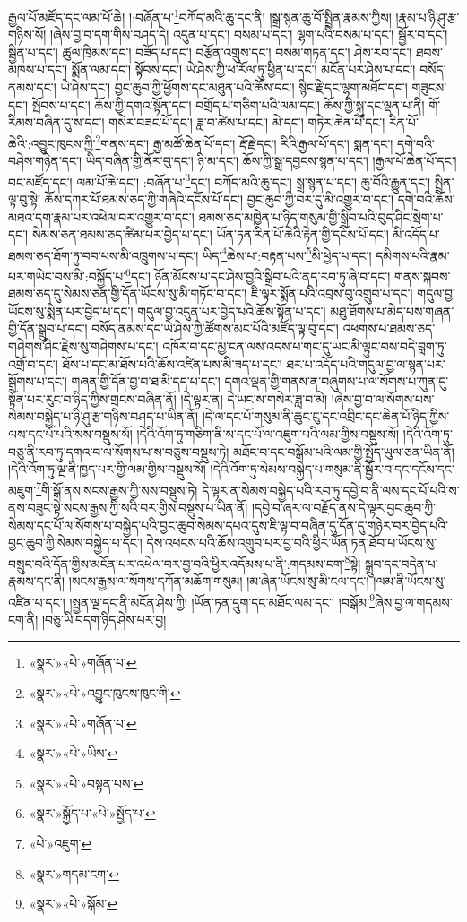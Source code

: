 རྒྱལ་པོ་མཛོད་དང་ལམ་པོ་ཆེ། །:བཞོན་པ་\footnote{«སྣར་»«པེ་»གཞོན་པ་}བཀོད་མའི་ཆུ་དང་ནི། །སྒྲ་སྙན་ཆུ་བོ་སྤྲིན་རྣམས་ཀྱིས། །རྣམ་པ་ཉི་ཤུ་རྩ་གཉིས་སོ། །ཞེས་བྱ་བ་དག་གིས་བཤད་དེ། འདུན་པ་དང་། བསམ་པ་དང་། ལྷག་པའི་བསམ་པ་དང་། སྦྱོར་བ་དང་། སྦྱིན་པ་དང་། ཚུལ་ཁྲིམས་དང་། བཟོད་པ་དང་། བརྩོན་འགྲུས་དང་། བསམ་གཏན་དང་། ཤེས་རབ་དང་། ཐབས་མཁས་པ་དང་། སྨོན་ལམ་དང་། སྟོབས་དང་། ཡེ་ཤེས་ཀྱི་ཕ་རོལ་ཏུ་ཕྱིན་པ་དང་། མངོན་པར་ཤེས་པ་དང་། བསོད་ནམས་དང་། ཡེ་ཤེས་དང་། བྱང་ཆུབ་ཀྱི་ཕྱོགས་དང་མཐུན་པའི་ཆོས་དང་། སྙིང་རྗེ་དང་ལྷག་མཐོང་དང་། གཟུངས་དང་། སྤོབས་པ་དང་། ཆོས་ཀྱི་དགའ་སྟོན་དང་། བགྲོད་པ་གཅིག་པའི་ལམ་དང་། ཆོས་ཀྱི་སྐུ་དང་ལྡན་པ་ནི། གོ་རིམས་བཞིན་དུ་ས་དང་། གསེར་བཟང་པོ་དང་། ཟླ་བ་ཚེས་པ་དང་། མེ་དང་། གཏེར་ཆེན་པོ་དང་། རིན་པོ་ཆེའི་:འབྱུང་ཁུངས་ཀྱི་\footnote{«སྣར་»«པེ་»འབྱུང་ཁུངས་ཁུང་གི་}གནས་དང་། རྒྱ་མཚོ་ཆེན་པོ་དང་། རྡོ་རྗེ་དང་། རིའི་རྒྱལ་པོ་དང་། སྨན་དང་། དགེ་བའི་བཤེས་གཉེན་དང་། ཡིད་བཞིན་གྱི་ནོར་བུ་དང་། ཉི་མ་དང་། ཆོས་ཀྱི་སྒྲ་དབྱངས་སྙན་པ་དང་། །རྒྱལ་པོ་ཆེན་པོ་དང་། བང་མཛོད་དང་། ལམ་པོ་ཆེ་དང་། :བཞོན་པ་\footnote{«སྣར་»«པེ་»གཞོན་པ་}དང་། བཀོད་མའི་ཆུ་དང་། སྒྲ་སྙན་པ་དང་། ཆུ་བོའི་རྒྱུན་དང་། སྤྲིན་ལྟ་བུ་སྟེ། ཆོས་དཀར་པོ་ཐམས་ཅད་ཀྱི་གཞིའི་དངོས་པོ་དང་། བྱང་ཆུབ་ཀྱི་བར་དུ་མི་འགྱུར་བ་དང་། དགེ་བའི་ཆོས་མཐའ་དག་རྣམ་པར་འཕེལ་བར་འགྱུར་བ་དང་། ཐམས་ཅད་མཁྱེན་པ་ཉིད་གསུམ་གྱི་སྒྲིབ་པའི་བུད་ཤིང་སྲེག་པ་དང་། སེམས་ཅན་ཐམས་ཅད་ཚིམ་པར་བྱེད་པ་དང་། ཡོན་ཏན་རིན་པོ་ཆེའི་རྟེན་གྱི་དངོས་པོ་དང་། མི་འདོད་པ་ཐམས་ཅད་ཐོག་ཏུ་བབ་པས་མི་འཁྲུགས་པ་དང་། ཡིད་\footnote{«སྣར་»«པེ་»ཡིས་}ཆེས་པ་:བརྟན་པས་\footnote{«སྣར་»«པེ་»བསྟན་པས་}མི་ཕྱེད་པ་དང་། དམིགས་པའི་རྣམ་པར་གཡེང་བས་མི་:བསྐྱོད་པ་\footnote{«སྣར་»སྐྱོད་པ་«པེ་»སྤྱོད་པ་}དང་། ཉོན་མོངས་པ་དང་ཤེས་བྱའི་སྒྲིབ་པའི་ནད་རབ་ཏུ་ཞི་བ་དང་། གནས་སྐབས་ཐམས་ཅད་དུ་སེམས་ཅན་གྱི་དོན་ཡོངས་སུ་མི་གཏོང་བ་དང་། ཇི་ལྟར་སྨོན་པའི་འབྲས་བུ་འགྲུབ་པ་དང་། གདུལ་བྱ་ཡོངས་སུ་སྨིན་པར་བྱེད་པ་དང་། གདུལ་བྱ་འདུན་པར་བྱེད་པའི་ཆོས་སྟོན་པ་དང་། མཐུ་ཐོགས་པ་མེད་པས་གཞན་གྱི་དོན་སྒྲུབ་པ་དང་། བསོད་ནམས་དང་ཡེ་ཤེས་ཀྱི་ཚོགས་མང་པོའི་མཛོད་ལྟ་བུ་དང་། འཕགས་པ་ཐམས་ཅད་གཤེགས་ཤིང་རྗེས་སུ་གཤེགས་པ་དང་། འཁོར་བ་དང་མྱ་ངན་ལས་འདས་པ་གང་དུ་ཡང་མི་ལྟུང་བས་བདེ་བླག་ཏུ་འགྲོ་བ་དང་། ཐོས་པ་དང་མ་ཐོས་པའི་ཆོས་འཛིན་པས་མི་ཟད་པ་དང་། ཐར་པ་འདོད་པའི་གདུལ་བྱ་ལ་སྙན་པར་སྒྲོགས་པ་དང་། གཞན་གྱི་དོན་བྱ་བ་ཐ་མི་དད་པ་དང་། དགའ་ལྡན་གྱི་གནས་ན་བཞུགས་པ་ལ་སོགས་པ་ཀུན་དུ་སྟོན་པར་རུང་བ་ཉིད་ཀྱིས་གྲངས་བཞིན་ནོ། །དེ་ལྟར་ན། དེ་ཡང་ས་གསེར་ཟླ་བ་མེ། །ཞེས་བྱ་བ་ལ་སོགས་པས་སེམས་བསྐྱེད་པ་ཉི་ཤུ་རྩ་གཉིས་བཤད་པ་ཡིན་ནོ། །དེ་ལ་དང་པོ་གསུམ་ནི་ཆུང་ངུ་དང་འབྲིང་དང་ཆེན་པོ་ཉིད་ཀྱིས་ལས་དང་པོ་པའི་སས་བསྡུས་སོ། །དེའི་འོག་ཏུ་གཅིག་ནི་ས་དང་པོ་ལ་འཇུག་པའི་ལམ་གྱིས་བསྡུས་སོ། །དེའི་འོག་ཏུ་བཅུ་ནི་རབ་ཏུ་དགའ་བ་ལ་སོགས་པ་ས་བཅུས་བསྡུས་ཏེ། མཐོང་བ་དང་བསྒོམ་པའི་ལམ་གྱི་སྤྱོད་ཡུལ་ཅན་ཡིན་ནོ། །དེའི་འོག་ཏུ་ལྔ་ནི་ཁྱད་པར་གྱི་ལམ་གྱིས་བསྡུས་སོ། །དེའི་འོག་ཏུ་སེམས་བསྐྱེད་པ་གསུམ་ནི་སྦྱོར་བ་དང་དངོས་དང་མཇུག་\footnote{«པེ་»འཇུག་}གི་སྒོ་ནས་སངས་རྒྱས་ཀྱི་སས་བསྡུས་ཏེ། དེ་ལྟར་ན་སེམས་བསྐྱེད་པའི་རབ་ཏུ་དབྱེ་བ་ནི་ལས་དང་པོ་པའི་ས་ནས་བཟུང་སྟེ་སངས་རྒྱས་ཀྱི་སའི་བར་གྱིས་བསྡུས་པ་ཡིན་ནོ། །དབྱེ་བ་ཞར་ལ་བརྗོད་ནས་དེ་ལྟར་བྱང་ཆུབ་ཀྱི་སེམས་དང་པོ་ལ་སོགས་པ་བསྐྱེད་པའི་བྱང་ཆུབ་སེམས་དཔའ་དུས་ཇི་ལྟ་བ་བཞིན་དུ་དོན་དུ་གཉེར་བར་བྱེད་པའི་བྱང་ཆུབ་ཀྱི་སེམས་བསྐྱེད་པ་དང་། དེས་འཕངས་པའི་ཆོས་འགྲུབ་པར་བྱ་བའི་ཕྱིར་ཡོན་ཏན་ཐོབ་པ་ཡོངས་སུ་བསྲུང་བའི་དོན་གྱིས་མངོན་པར་འཕེལ་བར་བྱ་བའི་ཕྱིར་འདོམས་པ་ནི་:གདམས་ངག་\footnote{«སྣར་»གདམ་ངག་}སྟེ། སྒྲུབ་དང་བདེན་པ་རྣམས་དང་ནི། །སངས་རྒྱས་ལ་སོགས་དཀོན་མཆོག་གསུམ། །མ་ཞེན་ཡོངས་སུ་མི་ངལ་དང་། །ལམ་ནི་ཡོངས་སུ་འཛིན་པ་དང་། །སྤྱན་ལྔ་དང་ནི་མངོན་ཤེས་ཀྱི། །ཡོན་ཏན་དྲུག་དང་མཐོང་ལམ་དང་། །བསྒོམ་\footnote{«སྣར་»«པེ་»སྒོམ་}ཞེས་བྱ་ལ་གདམས་ངག་ནི། །བཅུ་ཡི་བདག་ཉིད་ཤེས་པར་བྱ། 